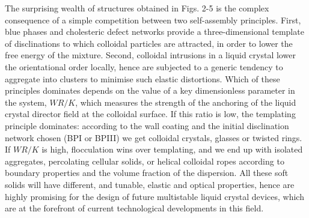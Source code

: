 \documentclass[12pt]{article}
\begin{document}

The surprising wealth of structures obtained in Figs. 2-5 is the complex 
consequence of a simple competition between two self-assembly principles. 
First, blue phases and cholesteric defect networks provide a three-dimensional 
template of disclinations to which colloidal particles are attracted, in order 
to lower the free energy of the mixture. Second, colloidal intrusions in a 
liquid crystal lower the orientational order locally, hence are subjected to a 
generic tendency to aggregate into clusters to minimise such elastic
distortions. Which of these principles dominates depends on the value of a key 
dimensionless parameter in the system, $WR/K$, which measures the strength of 
the anchoring of the liquid crystal director field at the colloidal surface. 
If this ratio is low, the templating principle dominates: according to
the wall coating and the initial disclination network chosen (BPI or BPIII) 
we get colloidal crystals, glasses or twisted rings. If $WR/K$ is high,
flocculation wins over templating, and we end up with isolated aggregates,
percolating cellular solids, or helical colloidal ropes according to
boundary properties and the volume fraction of the dispersion. All these
soft solids will have different, and tunable, elastic and optical properties,
hence are highly promising for the design of future multistable liquid
crystal devices, which are at the forefront of current technological 
developments in this field.
\end{document}

